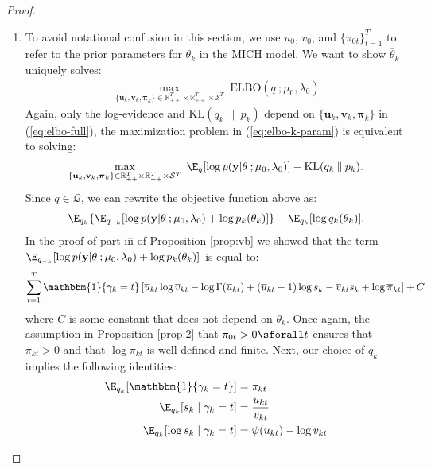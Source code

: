 \begin{proof}
\begin{enumerate}[label=\roman*.]
\item To avoid notational confusion in this section, we use $u_0$, $v_0$, and $\{\pi_{0t}\}_{t=1}^T$ to refer to the prior parameters for $\theta_k$ in the MICH model. We want to show $\overline{\theta}_k$ uniquely solves: 
\begin{align}
    \max_{\{\mathbf{u}_k, \mathbf{v}_k, \boldsymbol{\pi}_k\} \in \mathbb{R}_{++}^T\times\mathbb{R}_{++}^T \times\mathcal{S}^T} \;  \text{ELBO}(q\:;\mu_0,\lambda_0) \label{eq:elbo-k-param}
\end{align}
Again, only the log-evidence and $\text{KL}(q_k\:\lVert\: p_k)$ depend on $\{\mathbf{u}_k, \mathbf{v}_k, \boldsymbol{\pi}_k\}$ in (\ref{eq:elbo-full}), the maximization problem in (\ref{eq:elbo-k-param}) is equivalent to solving: 
\begin{align*}
    \max_{\{\mathbf{u}_k, \mathbf{v}_k, \boldsymbol{\pi}_k\} \in \mathbb{R}_{++}^T\times\mathbb{R}_{++}^T \times\mathcal{S}^T} \;  \E_q[\log p(\mathbf{y}| \theta\:; \mu_0,\lambda_0)] - \text{KL}(q_k\:\lVert\: p_k).
\end{align*}
Since $q \in \mathcal{Q}$, we can rewrite the objective function above as:
\begin{align*}
    \E_{q_k}\{\E_{q_{-k}}[\log p(\mathbf{y}| \theta\:; \mu_0,\lambda_0)+\log p_k(\theta_k)]\} - \E_{q_k}[\log q_k(\theta_k)].
\end{align*}
In the proof of part iii of Proposition \ref{prop:vb} we showed that the term $\E_{q_{-k}}[\log p(\mathbf{y}| \theta\:; \mu_0,\lambda_0)+\log p_k(\theta_k)]$ is equal to:
\begin{align*}
     \sum_{t=1}^T \mathbbm{1}\{\gamma_k = t\}\left[ \overline{u}_{kt} \log \overline{v}_{kt} -  \log\Gamma(\overline{u}_{kt}) + \left(\overline{u}_{kt} -1\right)\log s_{k}  - \overline{v}_{kt} s_{k} + \log \overline{\pi}_{kt}\right] + C
\end{align*}
where $C$ is some constant that does not depend on $\theta_k$. Once again, the assumption in Proposition \ref{prop:2} that $\pi_{0t} > 0 \sforall t$ ensures that $\overline{\pi}_{kt} > 0$ and that $\log \overline{\pi}_{kt}$ is well-defined and finite. Next, our choice of $q_k$ implies the following identities:
\begin{align*}
    \E_{q_k}[\mathbbm{1}\{\gamma_k = t\}] &= \pi_{kt} \\
    \E_{q_k}[s_{k}\;|\;\gamma_k=t] &= \frac{u_{kt}}{v_{kt}} \\
    \E_{q_k}[\log s_{k}\;|\;\gamma_k=t] &= \psi(u_{kt}) - \log v_{kt}
\end{align*}

\end{enumerate}
\end{proof}
